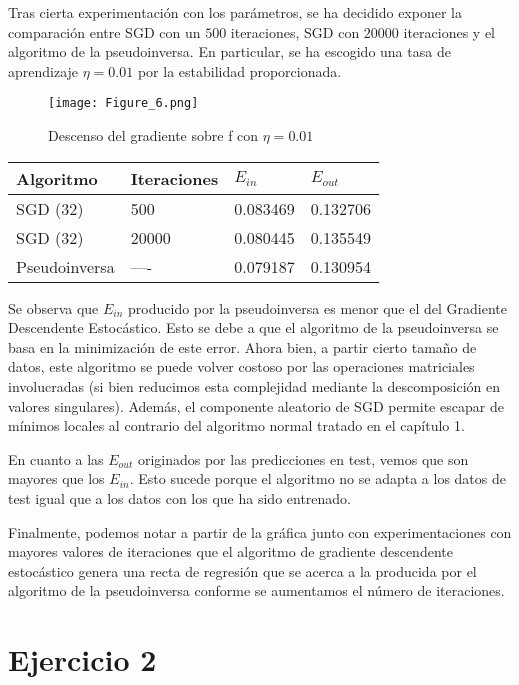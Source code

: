 Tras cierta experimentación con los parámetros, se ha decidido exponer la comparación entre SGD con
un $500$ iteraciones, SGD con $20000$ iteraciones y el algoritmo de la
pseudoinversa. En particular, se ha escogido una tasa de aprendizaje 
$\eta = 0.01$ por la estabilidad proporcionada.

\begin{figure}[H]
\centering
\texttt{[image: Figure\_6.png]}
\caption{Descenso del gradiente sobre f con $\eta=0.01$}
\end{figure}

\begin{table}[!ht]
    \centering
    \begin{tabular}{llll} 
    \toprule
        Algoritmo & Iteraciones & $E_{in}$ & $E_{out}$ \\ \midrule
        SGD (32)  & 500 & 0.083469 & 0.132706 \\ 
        SGD (32) & 20000 & 0.080445 & 0.135549 \\ 
        Pseudoinversa  & ---- &  0.079187 & 0.130954 \\ \bottomrule
    \end{tabular}
\end{table}

Se observa que $E_{in}$ producido por la pseudoinversa es menor que el del
Gradiente Descendente Estocástico. Esto se debe a que el algoritmo de la
pseudoinversa se basa en la minimización de este error. Ahora bien, a partir
cierto tamaño de datos, este algoritmo se puede volver costoso por las operaciones
matriciales involucradas (si bien reducimos esta complejidad mediante la descomposición
en valores singulares). Además, el componente aleatorio de SGD permite escapar de mínimos
locales al contrario del algoritmo normal tratado en el capítulo 1.

En cuanto a las $E_{out}$ originados por las predicciones en test, vemos que son
mayores que los $E_{in}$. Esto sucede porque el algoritmo no se adapta a los datos
de test igual que a los datos con los que ha sido entrenado.

Finalmente, podemos notar a partir de la gráfica junto con experimentaciones con mayores
valores de iteraciones que el algoritmo de gradiente descendente estocástico
genera una recta de regresión que se acerca a la producida por el algoritmo de
la pseudoinversa conforme se aumentamos el número de iteraciones.


\section{Ejercicio 2}

